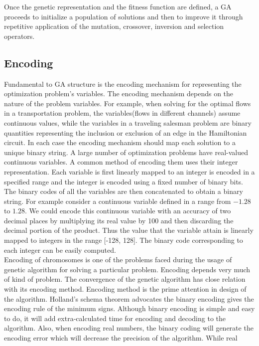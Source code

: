 \documentclass[a4paper, 12pt]{article}
\begin{document}
Once the genetic representation and the fitness function are defined, a GA proceeds to initialize a population of solutions and then to improve it through repetitive application of the mutation, crossover, inversion and selection operators.
\subsection{Encoding}
Fundamental to GA structure is the encoding mechanism for representing the optimization problem's variables. The encoding mechanism depends on
the nature of the problem variables. For example, when solving for the optimal flows in a transportation problem, the variables(flows in 
different channels) assume continuous values, while the variables in a traveling salesman problem are binary quantities representing the 
inclusion or exclusion of an edge in the Hamiltonian circuit. In each case the encoding mechanism should map each solution to a unique binary
string. A large number of optimization problems have real-valued continuous variables. A common method of encoding them uses their integer 
representation. Each variable is first linearly mapped to an integer is encoded in a specified range and the integer is encoded using a fixed
number of binary bits. The binary codes of all the variables are then concatenated to obtain a binary string. For example consider a continuous
variable defined in a range from $-1.28$ to $1.28$. We could encode this continuous variable with an accuracy of two decimal places by 
multiplying its real value by 100 and then discarding the decimal portion of the product. Thus the value that the variable attain is linearly 
mapped to integers in the range [-128, 128]. The binary code corresponding to each integer can be easily computed.\\
Encoding of chromosomes is one of the problems faced during the usage of genetic algorithm for solving a particular problem. Encoding depends very much of kind of problem. The convergence of the genetic algorithm has close relation with its encoding method. Encoding method is the prime
attention in design of the algorithm. Holland's schema theorem advocates the binary encoding gives the encoding rule of the minimum signs. 
Although binary encoding is simple and easy to do, it will add extra-calculated time for encoding and decoding to the algorithm. Also, when 
encoding real numbers, the binary coding will generate the encoding error which will decrease the precision of the algorithm. While real 
\end{document}
